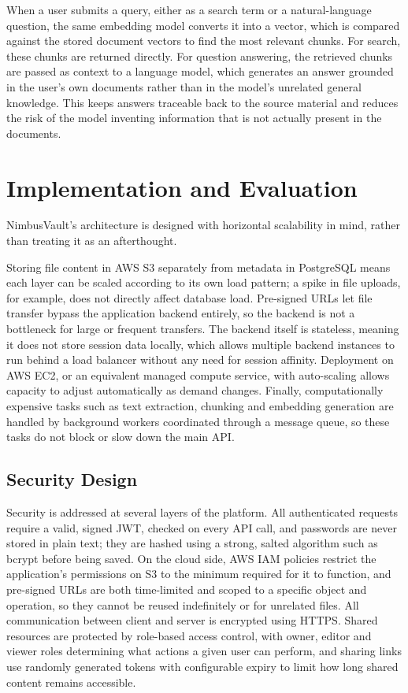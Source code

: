 \documentclass{tietreport}
\begin{document}
When a user submits a query, either as a search term or a natural-language question, the same embedding model converts it into a vector, which is compared against the stored document vectors to find the most relevant chunks. For search, these chunks are returned directly. For question answering, the retrieved chunks are passed as context to a language model, which generates an answer grounded in the user's own documents rather than in the model's unrelated general knowledge. This keeps answers traceable back to the source material and reduces the risk of the model inventing information that is not actually present in the documents.

\chapter{Implementation and Evaluation}

NimbusVault's architecture is designed with horizontal scalability in mind, rather than treating it as an afterthought.

Storing file content in AWS S3 separately from metadata in PostgreSQL means each layer can be scaled according to its own load pattern; a spike in file uploads, for example, does not directly affect database load. Pre-signed URLs let file transfer bypass the application backend entirely, so the backend is not a bottleneck for large or frequent transfers. The backend itself is stateless, meaning it does not store session data locally, which allows multiple backend instances to run behind a load balancer without any need for session affinity. Deployment on AWS EC2, or an equivalent managed compute service, with auto-scaling allows capacity to adjust automatically as demand changes. Finally, computationally expensive tasks such as text extraction, chunking and embedding generation are handled by background workers coordinated through a message queue, so these tasks do not block or slow down the main API.

\section{Security Design}

Security is addressed at several layers of the platform. All authenticated requests require a valid, signed JWT, checked on every API call, and passwords are never stored in plain text; they are hashed using a strong, salted algorithm such as bcrypt before being saved. On the cloud side, AWS IAM policies restrict the application's permissions on S3 to the minimum required for it to function, and pre-signed URLs are both time-limited and scoped to a specific object and operation, so they cannot be reused indefinitely or for unrelated files. All communication between client and server is encrypted using HTTPS. Shared resources are protected by role-based access control, with owner, editor and viewer roles determining what actions a given user can perform, and sharing links use randomly generated tokens with configurable expiry to limit how long shared content remains accessible.
\end{document}
